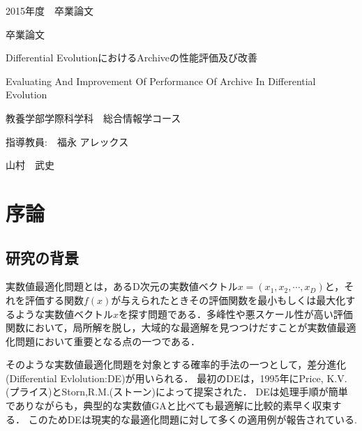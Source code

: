 \documentclass[a4paper,11pt,oneside,openany]{jsbook}
\begin{document}
\thispagestyle{empty}
2015年度　卒業論文%
\bigskip%
\LARGE%
\begin{center}
卒業論文
\end{center}
\bigskip\bigskip\bigskip\bigskip\bigskip\bigskip\bigskip %
\begin{center} %
Differential EvolutionにおけるArchiveの性能評価及び改善
\end{center}
\large %
\begin{center}
Evaluating And Improvement Of Performance Of Archive In Differential Evolution
\end{center}
\bigskip\bigskip\bigskip\bigskip\bigskip\bigskip\bigskip\bigskip\bigskip\bigskip
\bigskip\bigskip\bigskip\bigskip\bigskip\bigskip\bigskip\bigskip\bigskip
\Large %
\begin{center}
教養学部学際科学科　総合情報学コース
\end{center}
\Large %
\begin{center}
指導教員:　福永 アレックス
\end{center}
\LARGE %
\begin{center}
山村　武史
\end{center}
\normalsize
\thispagestyle{empty}
\tableofcontents

\chapter{序論}
\section{研究の背景}
実数値最適化問題とは，あるD次元の実数値ベクトル${x} = (x_1, x_2, \cdots, x_D)$と，それを評価する関数$f(x)$が与えられたときその評価関数を最小もしくは最大化するような実数値ベクトル$x$を探す問題である．多峰性や悪スケール性が高い評価関数において，局所解を脱し，大域的な最適解を見つつけだすことが実数値最適化問題において重要となる点の一つである．

そのような実数値最適化問題を対象とする確率的手法の一つとして，差分進化(Differential Evlolution:DE)\cite{Storn}が用いられる．
最初のDEは，1995年にPrice, K.V.(プライス)とStorn,R.M.(ストーン)によって提案された．
DEは処理手順が簡単でありながらも，典型的な実数値GAと比べても最適解に比較的素早く収束する．
このためDEは現実的な最適化問題に対して多くの適用例が報告されている\cite{ExDE}.
\end{document}
